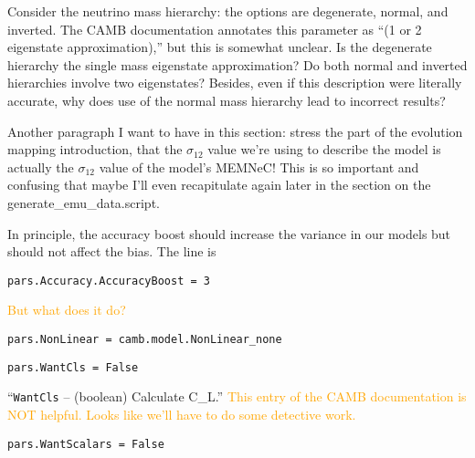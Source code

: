 Consider the neutrino mass 
hierarchy: the options are degenerate, normal, and inverted. The CAMB 
documentation annotates this parameter as ``(1 or 2 eigenstate 
approximation),'' but this is somewhat unclear. Is the degenerate hierarchy 
the single mass eigenstate approximation? Do both normal and inverted 
hierarchies involve two eigenstates? Besides, even if this description were
literally accurate, why does use of the normal mass hierarchy lead to
incorrect results?



Another paragraph I want to have in this section: stress the part of the evolution mapping introduction, that the $\sigma_{12}$ value we're using to describe the model is actually the $\sigma_{12}$ value of the model's MEMNeC! This is so important and confusing that maybe I'll even recapitulate again later in the section on the generate\_emu\_data.script.


In principle, the accuracy boost should increase the variance in our models but should not affect the bias. The line is

\verb|pars.Accuracy.AccuracyBoost = 3|

\textcolor{orange}{But what does it do?}

\verb|pars.NonLinear = camb.model.NonLinear_none|


\verb|pars.WantCls = False|

``\verb|WantCls| – (boolean) Calculate C\_L.'' \textcolor{orange}{This entry 
of
the CAMB documentation is NOT helpful. Looks like we’ll have to do some
detective work.}

\verb|pars.WantScalars = False|

